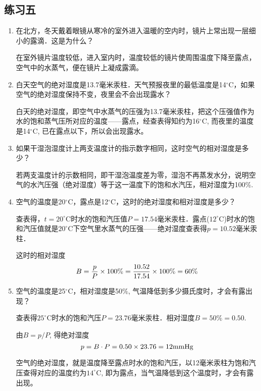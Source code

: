 \subsection{练习五}

\begin{enumerate}
	\item 在北方，冬天戴着眼镜从寒冷的室外进入温暖的空内时，镜片上常出现一层细小的露滴．这是为什么？
    
  \begin{solution}
在室外镜片温度较低，进入室内时，温度较低的镜片使周围温度下降至露点，空气中的水蒸气，便在镜片上凝成露滴。
  \end{solution}
\item 白天空气的绝对湿度是13.7毫米汞柱．天气预报夜里的最低温度是14$^\circ$C，如果空气的绝对湿度保持不变，夜里会不会出现露水？
    
\begin{solution}
  白天的绝对湿度，即空气中水蒸气的压强为13.7毫米汞柱，把这个压强值作为水的饱和蒸气压所对应的温度——露点，经查表得知约为16$^\circ$C, 而夜里的温度是14$^\circ$C, 已在露点以下，所以会出现露水。
\end{solution}
\item 如果干湿泡湿度计上两支温度计的指示数字相同，这时空气的相对湿度是多少？
    
\begin{solution}
若两支温度计的示数相同，即干湿泡温度差为零，湿泡不再蒸发水分，说明空气的水汽压强（绝对湿度）等于这一温度下的饱和水汽压，相对湿度为100\%.
\end{solution}
\item 空气的温度是20$^\circ$C，露点是12$^\circ$C，这时的绝对湿度和相对湿度是多少？
    
\begin{solution}
查表得，$t=20^{\circ}$C时水的饱和汽压值$P=17.54$毫米汞柱．露点($12^{\circ}$C)时水的饱和汽压值就是$20^{\circ}$C下空气里水蒸气的压强——绝对湿度查表得$p=10.52$毫米汞柱．

这时的相对湿度
\[B=\frac{p}{P}\times100\%=\frac{10.52}{17.54}\times100\%=60\%\]
\end{solution}
\item 空气的温度是25$^\circ$C，相对湿度是50\%, 气温降低到多少摄氏度时，才会有露出现？
    
\begin{solution}
  查表得$25^{\circ}$C时水的饱和汽压$P=23.76$毫米汞柱．相对湿度$B=50\%=0.50$.

由$B=p/P$, 得绝对湿度
\[p=B\cdot P=0.50\times23.76=12{\rm mmHg}\]

空气的绝对湿度，就是温度降至露点时水的饱和汽压，以12毫米汞柱为饱和汽压查得对应的温度约为$14^{\circ}$C, 即为露点，当气温降低到这个温度时，才会有露出现。
\end{solution}
\end{enumerate}

